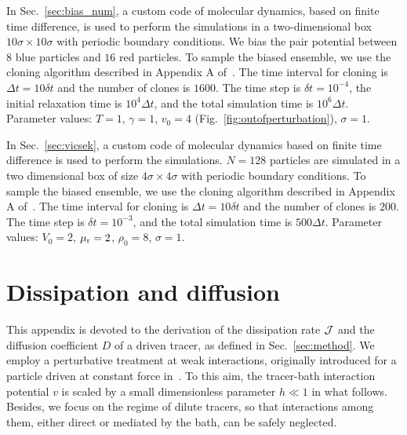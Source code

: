 \documentclass[superscriptaddress, twocolumn, prx, longbibliography, nofootinbib]{revtex4-1}
\begin{document}
In Sec.~\ref{sec:bias_num}, a custom code of molecular dynamics, based on finite time difference, is used to perform the simulations in a two-dimensional box $10\sigma\times 10\sigma$ with periodic boundary conditions. We bias the pair potential between $8$ blue particles and $16$ red particles. To sample the biased ensemble, we use the cloning algorithm described in Appendix A of~\cite{Nemoto2016}. The time interval for cloning is $\Delta t = 10 \delta t$ and the number of clones is $1600$. The time step is $\delta t = 10^{-4}$, the initial relaxation time is $10^4\Delta t$, and the total simulation time is $10^6 \Delta t$. Parameter values: $T=1$, $\gamma=1$, $v_0=4$ (Fig.~\ref{fig:outofperturbation}), $\sigma=1$.


In Sec.~\ref{sec:vicsek}, a custom code of molecular dynamics based on finite time difference is used to perform the simulations. $N=128$ particles are simulated in a two dimensional box of size $4\sigma\times 4\sigma$ with periodic boundary conditions. To sample the biased ensemble, we use the cloning algorithm described in Appendix A of~\cite{Nemoto2016}. The time interval for cloning is $\Delta t = 10 \delta t$ and the number of clones is $200$. The time step is $\delta t = 10^{-3}$, and the total simulation time is $500 \Delta t$. Parameter values: $V_0=2$, $\mu_{\rm r}=2$, $\rho_0=8$, $\sigma=1$.




\section{Dissipation and diffusion}\label{app:diff}

This appendix is devoted to the derivation of the dissipation rate $\cal J$ and the diffusion coefficient $D$ of a driven tracer, as defined in Sec.~\ref{sec:method}. We employ a perturbative treatment at weak interactions, originally introduced for a particle driven at constant force in~\cite{Demery2011, Demery2014}. To this aim, the tracer-bath interaction potential $v$ is scaled by a small dimensionless parameter $h\ll1$ in what follows. Besides, we focus on the regime of dilute tracers, so that interactions among them, either direct or mediated by the bath, can be safely neglected.
\end{document}

